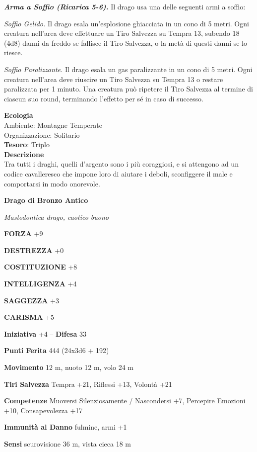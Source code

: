 \begin{multicols}{2}
\textit{\textbf{Arma a Soffio (Ricarica 5-6).}} Il drago usa una delle seguenti armi a soffio:

\textit{Soffio Gelido.} Il drago esala un'esplosione ghiacciata in un cono di 5 metri. Ogni creatura nell'area deve effettuare un Tiro Salvezza su Tempra 13, subendo 18 (4d8) danni da freddo se fallisce il Tiro Salvezza, o la metà di questi danni se lo riesce.

\textit{Soffio Paralizzante.} Il drago esala un gas paralizzante in un cono di 5 metri. Ogni creatura nell'area deve riuscire un Tiro Salvezza su Tempra 13 o restare paralizzata per 1 minuto. Una creatura può ripetere il Tiro Salvezza al termine di ciascun suo round, terminando l'effetto per sé in caso di successo.

\textbf{Ecologia}\\
Ambiente: Montagne Temperate\\
Organizzazione: Solitario\\
\textbf{Tesoro}: Triplo\\
\textbf{Descrizione}\\
Tra tutti i draghi, quelli d'argento sono i più coraggiosi, e si attengono ad un codice cavalleresco che impone loro di aiutare i deboli, sconfiggere il male e comportarsi in modo onorevole.


\medskip{}\textbf{Drago di Bronzo Antico}

\textit{Mastodontica drago, caotico buono}

\textbf{FORZA} +9

\textbf{DESTREZZA} +0

\textbf{COSTITUZIONE} +8

\textbf{INTELLIGENZA} +4

\textbf{SAGGEZZA} +3

\textbf{CARISMA} +5

\textbf{Iniziativa} +4 -- \textbf{Difesa} 33

\textbf{Punti Ferita} 444 (24x3d6 + 192)

\textbf{Movimento} 12 m, nuoto 12 m, volo 24 m

\textbf{Tiri Salvezza} Tempra +21, Riflessi +13, Volontà +21

\textbf{Competenze} Muoversi Silenziosamente / Nascondersi +7, Percepire Emozioni +10, Consapevolezza +17

\textbf{Immunità al Danno} fulmine, armi +1

\textbf{Sensi} scurovisione 36 m, vista cieca 18 m


\end{multicols}
